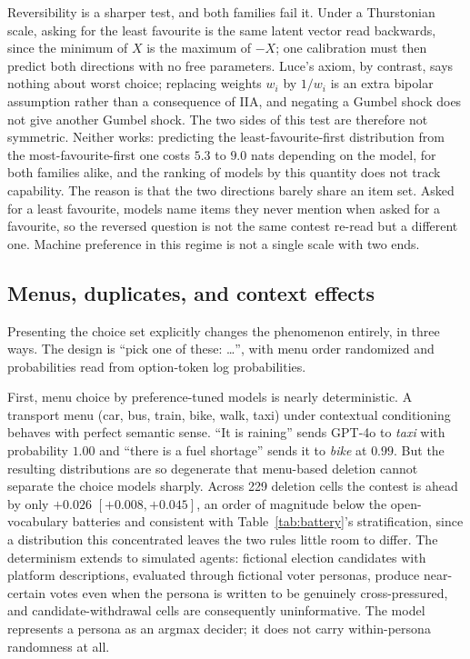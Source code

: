 \documentclass[11pt]{article}
\begin{document}
Reversibility is a sharper test, and both families fail it. Under a
Thurstonian scale, asking for the least favourite is the same latent vector
read backwards, since the minimum of $X$ is the maximum of $-X$; one
calibration must then predict both directions with no free parameters.
Luce's axiom, by contrast, says nothing about worst choice; replacing weights
$w_i$ by $1/w_i$ is an extra bipolar assumption rather than a consequence of
IIA, and negating a Gumbel shock does not give another Gumbel shock. The two
sides of this test are therefore not symmetric. Neither works: predicting the
least-favourite-first distribution from the most-favourite-first one costs
$5.3$ to $9.0$ nats depending on the model, for both families alike, and
the ranking of models by this quantity does not track capability. The
reason is that the two directions barely share an item set. Asked for a
least favourite, models name items they never mention when asked for a
favourite, so the reversed question is not the same contest re-read but a
different one. Machine preference in this regime is not a single scale
with two ends.

\subsection{Menus, duplicates, and context effects}
\label{sec:menus}

Presenting the choice set explicitly changes the phenomenon entirely, in
three ways. The design is ``pick one of these: \ldots'', with menu order
randomized and probabilities read from option-token log probabilities.

First, menu choice by preference-tuned models is nearly deterministic.
A transport menu (car, bus, train, bike, walk, taxi) under contextual
conditioning behaves with perfect semantic sense. ``It is raining''
sends GPT-4o to \emph{taxi} with probability $1.00$ and ``there is a fuel
shortage'' sends it to \emph{bike} at $0.99$. But the resulting distributions
are so degenerate that menu-based deletion cannot separate the choice
models sharply. Across 229 deletion cells the contest is ahead by only
$+0.026$ $[+0.008, +0.045]$, an order of magnitude below the open-vocabulary
batteries and consistent with Table~\ref{tab:battery}'s stratification, since
a distribution this concentrated leaves the two rules little room to differ. The determinism extends to
simulated agents: fictional election candidates with platform
descriptions, evaluated through fictional voter personas, produce
near-certain votes even when the persona is written to be genuinely
cross-pressured, and candidate-withdrawal cells are consequently
uninformative. The model represents a persona as an argmax decider; it
does not carry within-persona randomness at all.
\end{document}
